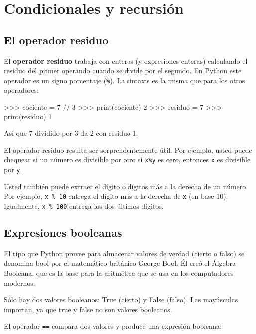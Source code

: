 \chapter{Condicionales y recursión}

\section{El operador residuo}

 

El \textbf{operador residuo} trabaja con enteros (y expresiones enteras)
calculando el residuo del primer operando cuando se divide por el
segundo. En Python este operador es un signo porcentaje (\texttt{\%}).
La sintaxis es la misma que para los otros operadores:

\begin{pyconcode}
>>> cociente = 7 // 3
>>> print(cociente)
2
>>> residuo = 7 %
>>> print(residuo)
1
\end{pyconcode}

Así que 7 dividido por 3 da 2 con residuo 1.

El operador residuo resulta ser sorprendentemente útil. Por ejemplo,
usted puede chequear si un número es divisible por otro si \texttt{x\%y}
es cero, entonces \texttt{x} es divisible por \texttt{y}.

Usted también puede extraer el dígito o dígitos más a la derecha de
un número. Por ejemplo, \texttt{x \% 10} entrega el dígito más a la
derecha de \texttt{x} (en base 10). Igualmente, \texttt{x \% 100}
entrega los dos últimos dígitos.

\section{Expresiones booleanas}

  

El tipo que Python provee para almacenar valores de verdad (cierto
o falso) se denomina bool por el matemático británico George Bool.
Él creó el Álgebra Booleana, que es la base para la aritmética que
se usa en los computadores modernos.

Sólo hay dos valores booleanos: True (cierto) y False (falso). Las
mayúsculas importan, ya que true y false no son valores booleanos.

El operador \texttt{==} compara dos valores y produce una expresión
booleana:

